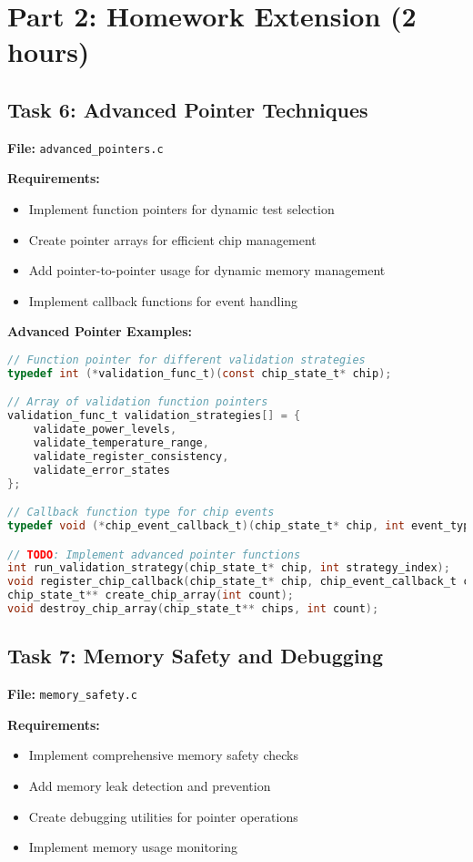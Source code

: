 \documentclass[11pt,a4paper]{article}
\begin{document}
\section{Part 2: Homework Extension (2 hours)}

\subsection{Task 6: Advanced Pointer Techniques}

\textbf{File:} \texttt{advanced\_pointers.c}

\textbf{Requirements:}
\begin{itemize}
    \item Implement function pointers for dynamic test selection
    \item Create pointer arrays for efficient chip management
    \item Add pointer-to-pointer usage for dynamic memory management
    \item Implement callback functions for event handling
\end{itemize}

\textbf{Advanced Pointer Examples:}
\begin{lstlisting}[language=C]
// Function pointer for different validation strategies
typedef int (*validation_func_t)(const chip_state_t* chip);

// Array of validation function pointers
validation_func_t validation_strategies[] = {
    validate_power_levels,
    validate_temperature_range,
    validate_register_consistency,
    validate_error_states
};

// Callback function type for chip events
typedef void (*chip_event_callback_t)(chip_state_t* chip, int event_type);

// TODO: Implement advanced pointer functions
int run_validation_strategy(chip_state_t* chip, int strategy_index);
void register_chip_callback(chip_state_t* chip, chip_event_callback_t callback);
chip_state_t** create_chip_array(int count);
void destroy_chip_array(chip_state_t** chips, int count);
\end{lstlisting}

\subsection{Task 7: Memory Safety and Debugging}

\textbf{File:} \texttt{memory\_safety.c}

\textbf{Requirements:}
\begin{itemize}
    \item Implement comprehensive memory safety checks
    \item Add memory leak detection and prevention
    \item Create debugging utilities for pointer operations
    \item Implement memory usage monitoring
\end{itemize}
\end{document}
